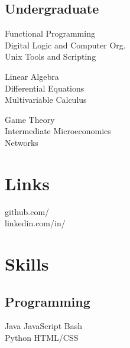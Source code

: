 \documentclass[]{deedy-resume-openfont}
\begin{document}
\begin{minipage}[t]{0.33\textwidth}
\subsection{Undergraduate}
Functional Programming \\
Digital Logic and Computer Org. \\
Unix Tools and Scripting \newline

Linear Algebra \\
Differential Equations\\
Multivariable Calculus\newline

Game Theory\\
Intermediate Microeconomics\\
Networks \\
\sectionsep


\section{Links} 
github.com/\href{https://github.com/cornellian}{} \\
linkedin.com/in/\href{https://www.linkedin.com/in/kuangjustin}{} \\
\sectionsep

\section{Skills}
\subsection{Programming}
Java \textbullet{}   JavaScript \textbullet{} Bash \\
Python \textbullet{} HTML/CSS 
\newline
\newline


\end{minipage}
\end{document}
